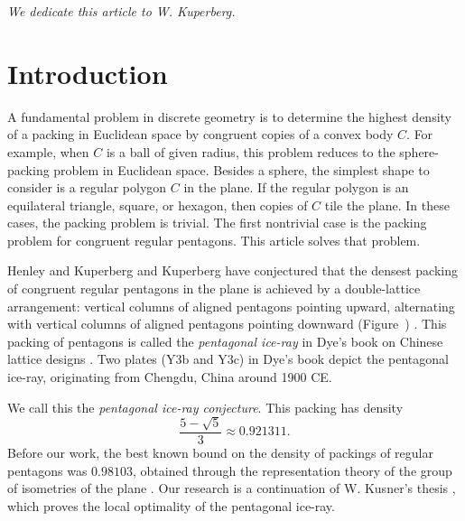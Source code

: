 \def\penp#1#2{%
\draw[red] (#1) + (#2:1cm) -- + (#2+72:1cm) -- 
  +(#2+144:1cm) -- +(#2+216:1cm) -- + (#2+288:1cm) -- cycle
}


\def\threepent#1#2#3#4#5#6#7#8#9{%
\pen{#1}{#2}{#3};
\pen{#4}{#5}{#6};
\pen{#7}{#8}{#9};
\draw[blue] (#1,#2) -- (#4,#5) -- (#7,#8) -- cycle
}

\def\threepentnoD#1#2#3#4#5#6#7#8#9{%
\pen{#1}{#2}{#3};
\pen{#4}{#5}{#6};
\pen{#7}{#8}{#9}
}

\def\blankfig#1{\tikzfig{#1}{Insert graphic}
{
[scale=1]
\draw(0,) circle(1cm);
}}



\centerline{\it We dedicate this article to W. Kuperberg.}

\section{Introduction}\label{sec:intro} 

A fundamental problem in discrete geometry is to determine the highest
density of a packing in Euclidean space by congruent copies of a
convex body $C$.  For example, when $C$ is a ball of given radius,
this problem reduces to the sphere-packing problem in Euclidean space.
Besides a sphere, the simplest shape to consider is a regular polygon
$C$ in the plane.  If the regular polygon is an equilateral
triangle, square, or hexagon, then copies of $C$ tile the plane.  In
these cases, the packing problem is trivial.  The first nontrivial
case is the packing problem for congruent regular pentagons.  This
article solves that problem.

Henley and Kuperberg and Kuperberg have conjectured that the densest
packing of congruent regular pentagons in the plane is achieved by a
double-lattice arrangement: vertical columns of aligned pentagons
pointing upward, alternating with vertical columns of aligned
pentagons pointing downward (Figure~)
\cite{Kup} \cite[p.801]{henley}.  This packing of pentagons is called
the {\it pentagonal ice-ray} in Dye's book on Chinese lattice designs
\cite{dye}.  Two plates (Y3b and Y3c) in Dye's book depict the
pentagonal ice-ray, originating from Chengdu, China around 1900 CE.

 We call this the {\it pentagonal ice-ray  conjecture}.
This packing has density
\[
\frac{5 - \sqrt{5}}3 \approx 0.921311.
\] %
Before our work, the best known bound on the density of packings of
regular pentagons was $0.98103$, obtained through the representation
theory of the group of isometries of the plane \cite{Val}.  Our
research is a continuation of W. Kusner's thesis \cite{Kus}, which
proves the local optimality of the pentagonal ice-ray.

